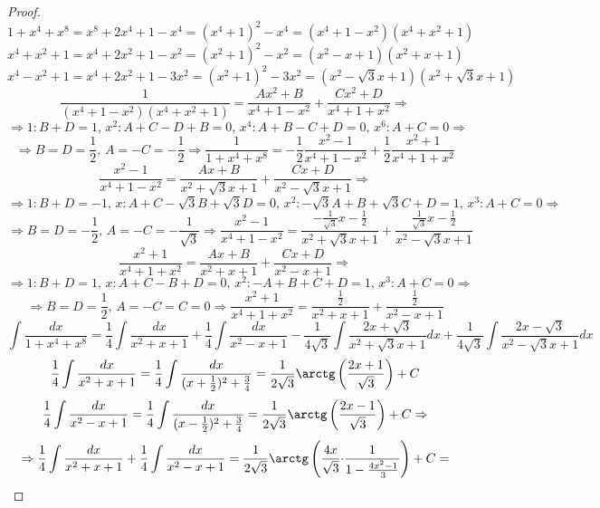 \documentclass[12pt]{article}
\theoremstyle{definition}
\DeclareMathOperator{\dint}{\displaystyle\int}
\begin{document}
\begin{proof}
	$$
		1 + x^4 + x^8 = x^8 + 2x^4 + 1 - x^4 = (x^4 + 1)^2 - x^4 = (x^4 + 1 - x^2)(x^4 + x^2 + 1)
	$$
	$$
		x^4 + x^2 + 1 = x^4 + 2x^2 + 1 - x^2 = (x^2 + 1)^2 - x^2 = (x^2 - x + 1)(x^2 + x + 1)
	$$
	$$
		x^4 - x^2 + 1 = x^4 + 2x^2 + 1 - 3x^2 = (x^2 + 1)^2 - 3x^2 = (x^2 - \sqrt{3}x + 1)(x^2 + \sqrt{3}x + 1)
	$$
	$$
		\dfrac{1}{(x^4 + 1 - x^2)(x^4 + x^2 + 1)} = \dfrac{Ax^2 + B}{x^4 + 1 - x^2} + \dfrac{Cx^2 + D}{x^4 + 1 + x^2} \Rightarrow 
	$$
	$$
		\Rightarrow 1\colon B + D = 1, \, x^2 \colon A + C - D + B = 0, \,  x^4 \colon A + B - C + D = 0, \, x^6 \colon A + C = 0  \Rightarrow
	$$
	$$
		\Rightarrow B = D = \dfrac{1}{2}, \, A = - C = - \dfrac{1}{2} \Rightarrow \dfrac{1}{1 + x^4 + x^8} = -\dfrac{1}{2}\dfrac{x^2 - 1}{x^4 + 1 - x^2} +\dfrac{1}{2}\dfrac{x^2 + 1}{x^4 + 1 + x^2}
	$$
	$$
		\dfrac{x^2 - 1}{x^4 + 1 - x^2} = \dfrac{Ax + B}{x^2 + \sqrt{3}x+ 1} + \dfrac{Cx + D}{x^2 - \sqrt{3}x + 1} \Rightarrow
	$$
	$$
		\Rightarrow 1 \colon B + D = -1,\, x \colon A + C - \sqrt{3}B + \sqrt{3}D = 0, \, x^2 \colon -\sqrt{3}A + B + \sqrt{3}C + D = 1,\, x^3 \colon A + C = 0 \Rightarrow
	$$
	$$
		\Rightarrow B = D = -\dfrac{1}{2}, \, A = - C = - \dfrac{1}{\sqrt{3}} \Rightarrow \dfrac{x^2 - 1}{x^4 + 1 - x^2} = \dfrac{-\tfrac{1}{\sqrt{3}}x - \tfrac{1}{2}}{x^2 + \sqrt{3}x+ 1} + \dfrac{\tfrac{1}{\sqrt{3}}x -\tfrac{1}{2}}{x^2 - \sqrt{3}x + 1}
	$$
	$$
		\dfrac{x^2 + 1}{x^4 + 1 + x^2} = \dfrac{Ax + B}{x^2 + x + 1} + \dfrac{Cx + D}{x^2 - x + 1} \Rightarrow
	$$
	$$
		\Rightarrow 1 \colon B + D = 1,\, x \colon A + C - B + D = 0, \, x^2 \colon -A + B + C + D = 1,\, x^3 \colon A + C = 0 \Rightarrow
	$$
	$$
		\Rightarrow B = D = \dfrac{1}{2}, \, A = - C = C = 0\Rightarrow \dfrac{x^2 + 1}{x^4 + 1 + x^2} = \dfrac{ \tfrac{1}{2}}{x^2 + x+ 1} + \dfrac{\tfrac{1}{2}}{x^2 - x + 1}
	$$
	$$
		\dint \dfrac{dx}{1 + x^4 + x^8} = \dfrac{1}{4}\dint\dfrac{dx}{x^2 + x + 1}   + \dfrac{1}{4}\dint\dfrac{dx}{x^2 - x + 1}  -\dfrac{1}{4\sqrt{3}}\dint\dfrac{2x + \sqrt{3}}{x^2 + \sqrt{3}x + 1}dx  + \dfrac{1}{4\sqrt{3}}\dint\dfrac{2x - \sqrt{3}}{x^2 - \sqrt{3}x + 1}dx
	$$
	$$
		\dfrac{1}{4}\dint\dfrac{dx}{x^2 + x + 1} = \dfrac{1}{4}\dint \dfrac{dx}{(x + \tfrac{1}{2})^2 + \tfrac{3}{4}} = \dfrac{1}{2\sqrt{3}}\arctg\left(\dfrac{2x + 1}{\sqrt{3}}\right) + C
	$$
	$$
		\dfrac{1}{4}\dint\dfrac{dx}{x^2 - x + 1} = \dfrac{1}{4}\dint \dfrac{dx}{(x - \tfrac{1}{2})^2 + \tfrac{3}{4}} = \dfrac{1}{2\sqrt{3}}\arctg\left(\dfrac{2x - 1}{\sqrt{3}}\right) + C \Rightarrow
	$$
	$$
		\Rightarrow  \dfrac{1}{4}\dint\dfrac{dx}{x^2 + x + 1}   + \dfrac{1}{4}\dint\dfrac{dx}{x^2 - x + 1} = \dfrac{1}{2\sqrt{3}}\arctg\left(\dfrac{4x}{\sqrt{3}}{\cdot}\dfrac{1}{1-\tfrac{4x^2 -1}{3}}\right) + C  =
$$
\end{proof}
\end{document}
